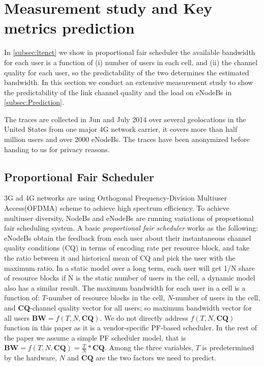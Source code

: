 \section{Measurement study and Key metrics prediction}\label{sec:prediction}
In \autoref{subsec:ltenet} we show in proportional fair scheduler the available bandwidth for each user is a function of (i) number of users in each cell, and (ii) the channel quality for each user, so the predictability of the two determines the estimated bandwidth. In this section we conduct an extensive measurement study to show the predictability of the link channel quality and the load on eNodeBs in \autoref{subsec:Prediction}. 

The traces are collected in Jun and July 2014 over several geolocations in the United States from one major 4G network carrier, it covers more than half million users and over 2000 eNodeBs. The traces have been anonymized before handing to us for privacy reasons. 

\subsection{Proportional Fair Scheduler}\label{subsec:ltenet}
3G ad 4G networks are using Orthogonal Frequency-Division Multiuser Access(OFDMA) scheme to achieve high spectrum efficiency. To achieve multiuser diversity, NodeBs and eNodeBs are running variations of proportional fair scheduling system. A basic \textit{proportional fair scheduler} works as the following: eNodeBs obtain the feedback from each user about their instantaneous channel quality conditions (CQ) in terms of encoding rate per resource block, and take the ratio between it and historical mean of CQ and pick the user with the maximum ratio. In a static model over a long term, each user will get 1/N share of resource blocks if N is the static number of users in the cell, a dynamic model also has a similar result\cite{PFINFOCOM}. The maximum bandwidth for each user in a cell is a function of: $T$-number of resource blocks in the cell, $N$-number of users in the cell, and $\mathbf{CQ}$-channel quality vector for all users; so maximum bandwidth vector for all users $\mathbf{BW} = f(T, N, \mathbf{CQ})$. We do not directly address $f(T, N, \mathbf{CQ})$ function in this paper as it is a vendor-specific PF-based scheduler. In the rest of the paper we assume a simple PF scheduler model, that is $\mathbf{BW} = f(T, N, \mathbf{CQ})=\frac{T}{N}*\mathbf{CQ}$. Among the three variables, $T$ is predetermined by the hardware, $N$ and $\mathbf{CQ}$ are the two factors we need to predict. 

